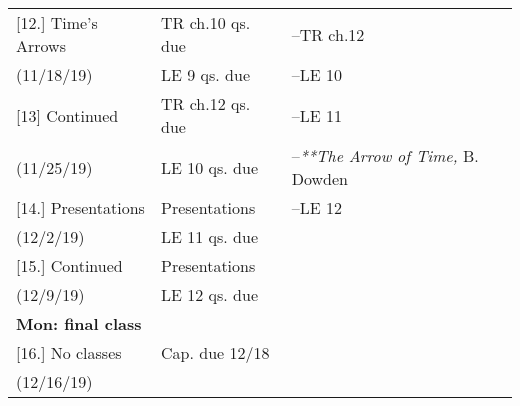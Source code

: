 \documentclass[article,oneside]{memoir}
\begin{document}
\begin{center}
\begin{longtable}{p{4.5cm}p{2.5cm}p{5cm}}


[12.] Time's Arrows			& TR ch.10 qs. due		& --TR ch.12 \\
(11/18/19)		 			& LE 9 qs. due	    	&  --LE 10 \\ [1.8\baselineskip]


[13] Continued			 	& TR ch.12 qs. due	& --LE 11\\
(11/25/19)					&  LE 10 qs. due	 &--\emph{**The Arrow of Time,} B. Dowden \\ [1.8\baselineskip]




				


[14.] Presentations 		& Presentations 			&    --LE 12 \\
(12/2/19)				       &   LE 11 qs. due	   	&  \\ [1.8\baselineskip]

						
[15.] 	Continued     			& 		Presentations	&   \\
(12/9/19)				      	& 	LE 12 qs. due		 &  \\ 
\textbf{Mon: final class}		&			&  \\ [1.8\baselineskip]

[16.] 	No classes	 	      		&  Cap. due 12/18				&   \\
(12/16/19)				      	&			      	&  \\  [1.8\baselineskip]



\end{longtable}
\end{center}




\end{document}
